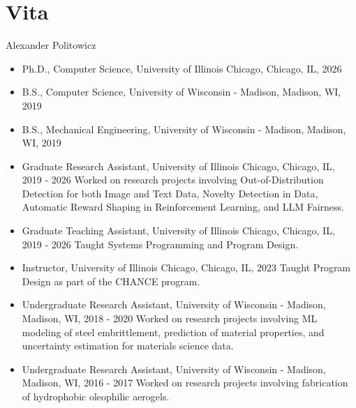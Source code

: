 \chapter*{Vita}
\begin{singlespace}
    \begin{description}[labelwidth=4cm,leftmargin=4.2cm,itemsep=1em]

        \item[NAME] Alexander Politowicz

        \item[EDUCATION] 
            \begin{itemize}[label={},listparindent=0pt,itemindent=0pt,leftmargin=0pt,itemsep=1em,parsep=0pt,topsep=0pt,partopsep=0pt]
            \item Ph.D., Computer Science, University of Illinois Chicago, Chicago, IL, 2026
            \item B.S., Computer Science, University of Wisconsin - Madison, Madison, WI, 2019
            \item B.S., Mechanical Engineering, University of Wisconsin - Madison, Madison, WI, 2019
            \end{itemize}

        \item[EXPERIENCE]
            \begin{itemize}[label={},listparindent=0pt,itemindent=0pt,leftmargin=0pt,itemsep=1em,parsep=0pt,topsep=0pt,partopsep=0pt]
            \item Graduate Research Assistant, University of Illinois Chicago, Chicago, IL, 2019 - 2026
            Worked on research projects involving Out-of-Distribution Detection for both Image and Text Data, Novelty Detection in Data, Automatic Reward Shaping in Reinforcement Learning, and LLM Fairness.
            \item Graduate Teaching Assistant, University of Illinois Chicago, Chicago, IL, 2019 - 2026
            Taught Systems Programming and Program Design.
            \item Instructor, University of Illinois Chicago, Chicago, IL, 2023
            Taught Program Design as part of the CHANCE program.
            \item Undergraduate Research Assistant, University of Wisconsin - Madison, Madison, WI, 2018 - 2020
            Worked on research projects involving ML modeling of steel embrittlement, prediction of material properties, and uncertainty estimation for materials science data.
            \item Undergraduate Research Assistant, University of Wisconsin - Madison, Madison, WI, 2016 - 2017
            Worked on research projects involving fabrication of hydrophobic oleophilic aerogels.
            \end{itemize}


\end{description}
\end{singlespace}
